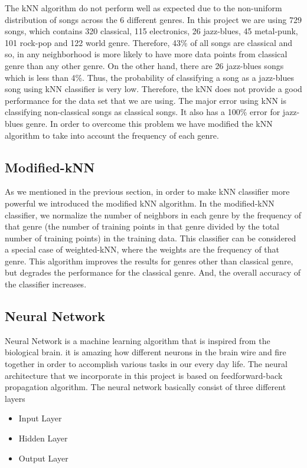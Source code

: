 \documentclass[12pt]{article}
\begin{document}
The kNN algorithm do not perform well as expected due to the non-uniform distribution of songs across the 6 different genres. In this project we are using 729 songs, which contains 320 classical, 115 electronics, 26 jazz-blues, 45 metal-punk, 101 rock-pop and 122 world genre. Therefore, 43\% of all songs are classical and so, in any neighborhood is more likely to have more data points from classical genre than any other genre. On the other hand, there are 26 jazz-blues songs which is less than 4\%. Thus, the probability of classifying a song as a jazz-blues song using kNN classifier is very low. Therefore, the kNN does not provide a good performance for the data set that we are using. The major error using kNN is classifying non-classical songs as classical songs. It also has a 100\% error for jazz-blues genre. In order to overcome this problem we have modified the kNN algorithm to take into account the frequency of each genre.

\subsection{Modified-kNN}
As we mentioned in the previous section, in order to make kNN classifier more powerful we introduced the modified kNN algorithm. In the modified-kNN classifier, we normalize the number of neighbors in each genre by the frequency of that genre (the number of training points in that genre divided by the total number of training points) in the training data. This classifier can be considered a special case of weighted-kNN, where the weights are the frequency of that genre. This algorithm improves the results for genres other than classical genre, but degrades the performance for the classical genre. And, the overall accuracy of the classifier increases.

\subsection{Neural Network}
Neural Network is a machine learning algorithm that is inspired from the biological brain. it is amazing how different neurons in the brain wire and fire together in order to accomplish various tasks in our every day life.
The neural architecture that we incorporate in this project is based on  feedforward-back propagation algorithm.
The neural network basically consist of three different layers
\begin{itemize}
  \item Input Layer
  \item Hidden Layer
   \item Output Layer
\end{itemize}
\end{document}
